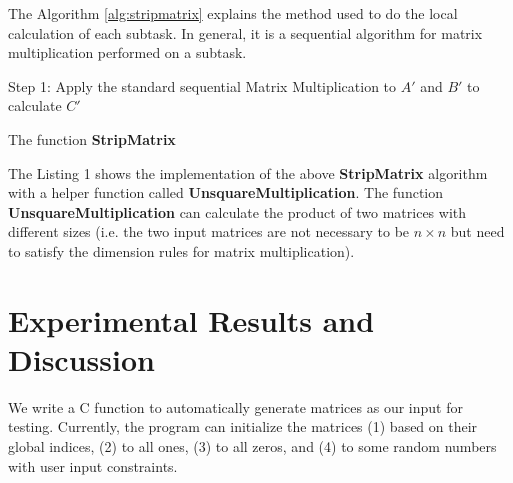 \documentclass[conference]{IEEEtran}
\begin{document}
 
The Algorithm \ref{alg:stripmatrix} explains the method used to do the local calculation of each subtask. In general, it is a sequential algorithm for matrix multiplication performed on a subtask.\\

\begin{algorithm}[H]
\SetAlgoLined
{}
 \Begin
  {Step 1: Apply the standard sequential Matrix Multiplication to $A'$ and $B'$ to calculate $C'$
  }
 \End
 \caption{ The function \textbf{StripMatrix}}
 \label{alg:stripmatrix}
\end{algorithm}

The Listing 1 shows the implementation of the above \textbf{StripMatrix} algorithm with a helper function called \textbf{UnsquareMultiplication}. The function \textbf{UnsquareMultiplication} can calculate the product of two matrices with different sizes (i.e. the two input matrices are not necessary to be $n \times n$ but need to satisfy the dimension rules for matrix multiplication). 
\lstset{ basicstyle=\footnotesize,breakatwhitespace=false,breaklines=true, tabsize = 2}



\section{Experimental Results and Discussion}\label{results}
We write a C function to automatically generate matrices as our input for testing. Currently, the program can initialize the matrices (1) based on their global indices, (2) to all ones, (3) to all zeros, and (4) to some random numbers with user input constraints. 
\end{document}
